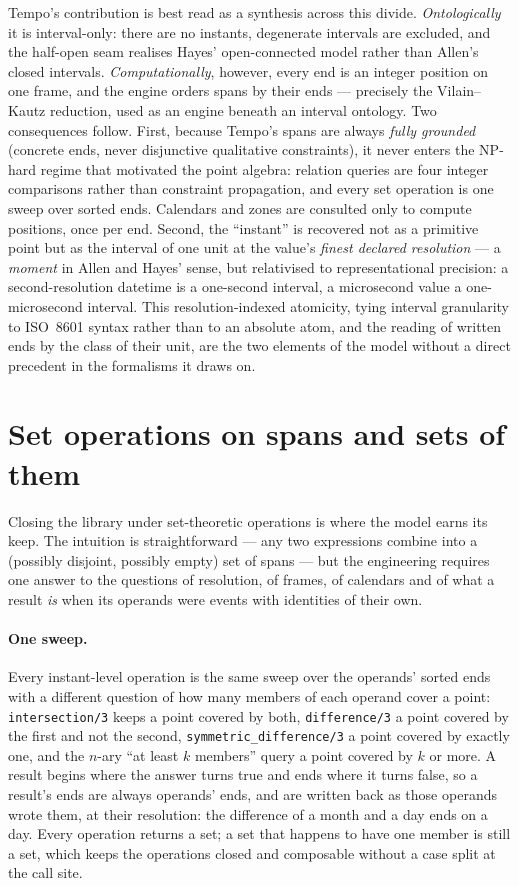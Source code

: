Tempo's contribution is best read as a synthesis across this divide.
\emph{Ontologically} it is interval-only: there are no instants,
degenerate intervals are excluded, and the half-open seam realises
Hayes' open-connected model rather than Allen's closed intervals.
\emph{Computationally}, however, every end is an integer position on
one frame, and the engine orders spans by their ends --- precisely the
Vilain--Kautz reduction, used as an engine beneath an interval
ontology. Two consequences follow. First, because Tempo's spans are
always \emph{fully grounded} (concrete ends, never disjunctive
qualitative constraints), it never enters the NP-hard regime that
motivated the point algebra: relation queries are four integer
comparisons rather than constraint propagation, and every set
operation is one sweep over sorted ends. Calendars and zones are
consulted only to compute positions, once per end. Second, the
``instant'' is recovered not as a primitive point but as the interval
of one unit at the value's \emph{finest declared resolution} --- a
\emph{moment} in Allen and Hayes' sense, but relativised to
representational precision: a second-resolution datetime is a
one-second interval, a microsecond value a one-microsecond interval.
This resolution-indexed atomicity, tying interval granularity to
ISO~8601 syntax rather than to an absolute atom, and the reading of
written ends by the class of their unit, are the two elements of the
model without a direct precedent in the formalisms it draws on.

\section{Set operations on spans and sets of them}

Closing the library under set-theoretic operations is where the model
earns its keep. The intuition is straightforward --- any two
expressions combine into a (possibly disjoint, possibly empty) set of
spans --- but the engineering requires one answer to the questions of
resolution, of frames, of calendars and of what a result \emph{is}
when its operands were events with identities of their own.

\paragraph*{One sweep.} Every instant-level operation is the same
sweep over the operands' sorted ends with a different question of how
many members of each operand cover a point: \texttt{intersection/3}
keeps a point covered by both, \texttt{difference/3} a point covered by
the first and not the second, \texttt{symmetric\_difference/3} a point
covered by exactly one, and the $n$-ary ``at least $k$ members'' query
a point covered by $k$ or more. A result begins where the answer turns
true and ends where it turns false, so a result's ends are always
operands' ends, and are written back as those operands wrote them, at
their resolution: the difference of a month and a day ends on a day.
Every operation returns a set; a set that happens to have one member
is still a set, which keeps the operations closed and composable
without a case split at the call site.

